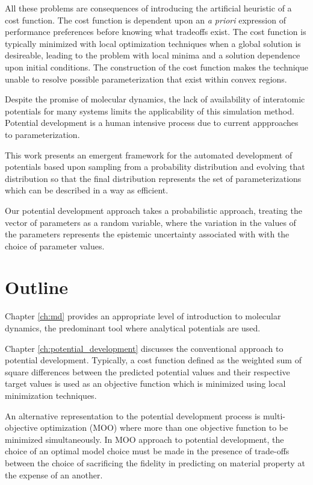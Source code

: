 All these problems are consequences of introducing the artificial heuristic of a cost function.  The cost function is dependent upon an \emph{a priori} expression of performance preferences before knowing what tradeoffs exist.  The cost function is typically minimized with local optimization techniques when a global solution is desireable, leading to the problem with local minima and a solution dependence upon initial conditions.  The construction of the cost function makes the technique unable to resolve possible parameterization that exist within convex regions.

Despite the promise of molecular dynamics, the lack of availability of interatomic potentials for many systems limits the applicability of this simulation method.  Potential development is a human intensive process due to current appproaches to parameterization.

This work presents an emergent framework for the automated development of potentials based upon sampling from a probability distribution and evolving that distribution so that the final distribution represents the set of parameterizations which can be described in a way as efficient.

Our potential development approach takes a probabilistic approach, treating the vector of parameters as a random variable, where the variation in the values of the parameters represents the epistemic uncertainty associated with with the choice of parameter values.

\section{Outline}
Chapter \ref{ch:md} provides an appropriate level of introduction to molecular dynamics, the predominant tool where analytical potentials are used.

Chapter \ref{ch:potential_development} discusses the  conventional approach to potential development.  Typically, a cost function defined as the weighted sum of square differences between the predicted potential values and their respective target values is used as an objective function which is minimized using local minimization techniques.

An alternative representation to the potential development process is multi-objective optimization (MOO) where more than one objective function to be minimized simultaneously.  In MOO approach to potential development, the choice of an optimal model choice must be made in the presence of trade-offs between the choice of sacrificing the fidelity in predicting on material property at the expense of an another.

